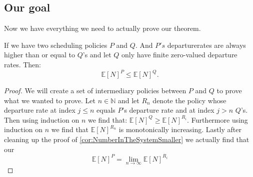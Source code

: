\subsection{Our goal}
Now we have everything we need to actually prove our theorem.
\begin{theorem}\label{thm:theorem2.3}
  If we have two scheduling policies $P$ and $Q$. And $P's$ departurerates are always higher than
  or equal to $Q$'s and let $Q$ only have finite zero-valued departure rates. Then: $$\mathbb{E}[N]^{P} \leq \mathbb{E}[N]^{Q}.$$
\end{theorem}

\begin{proof}
  We will create a set of intermediary policies between $P$ and $Q$ to prove what we wanted to prove.
  Let $n \in \mathbb{N}$ and let $R_n$ denote the policy whose departure rate at index $j \leq n$ equals
  $P$'s departure rate and at index $j > n$ $Q$'s. Then using induction on $n$ we find that:
  $\mathbb{E}[N]^{Q} \geq \mathbb{E}[N]^{R_i}$. Furthermore using induction on $n$ we find that
  $\mathbb{E}[N]^{R_n}$ is monotonically increasing. Lastly after cleaning up the proof of \ref{cor:NumberInTheSystemSmaller}
  we actually find that our $$\mathbb{E}[N]^P = \lim_{n \to \infty} \mathbb{E}[N]^{R_i}$$
\end{proof}
